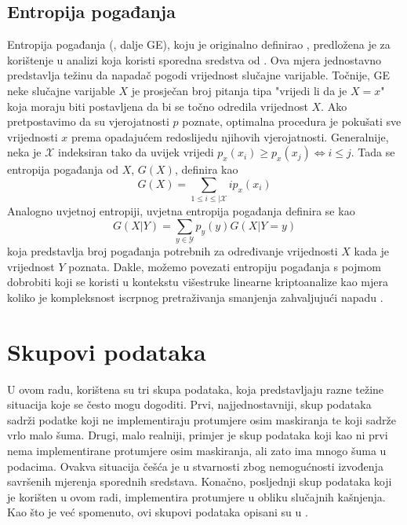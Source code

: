 \documentclass[times, utf8, diplomski]{fer}
\begin{document}
\subsection{Entropija pogađanja}

Entropija pogađanja (, dalje GE), koju je originalno definirao \cite{massey1994guessing}, predložena je za korištenje u analizi koja koristi sporedna sredstva od \cite{kopf2007information}. Ova mjera jednostavno predstavlja težinu da napadač pogodi vrijednost slučajne varijable. Točnije, GE neke slučajne varijable $X$ je prosječan broj pitanja tipa "vrijedi li da je $X = x$" koja moraju biti postavljena da bi se točno odredila vrijednost $X$. Ako pretpostavimo da su vjerojatnosti $p$ poznate, optimalna procedura je pokušati sve vrijednosti $x$ prema opadajućem redoslijedu njihovih vjerojatnosti. Generalnije, neka je $\mathcal{X}$ indeksiran tako da uvijek vrijedi $p_x(x_i) \ge p_x(x_j) \iff i \le j$. Tada se entropija pogađanja od $X$, $G(X)$, definira kao
\begin{equation}
    G(X) = \sum_{1 \le i \le \vert \mathcal{X}} i p_x(x_i)
\end{equation}
Analogno uvjetnoj entropiji, uvjetna entropija pogađanja definira se kao
\begin{equation}
    G(X \vert Y) = \sum_{y \in \mathcal{Y}} p_y(y) G(X \vert Y = y)
\end{equation}
koja predstavlja broj pogađanja potrebnih za određivanje vrijednosti $X$ kada je vrijednost $Y$ poznata. Dakle, možemo povezati entropiju pogađanja s pojmom dobrobiti koji se koristi u kontekstu višestruke linearne kriptoanalize kao mjera koliko je kompleksnost iscrpnog pretraživanja smanjenja zahvaljujući napadu \citep{standaert2009unified}.

\section{Skupovi podataka}
U ovom radu, korištena su tri skupa podataka, koja predstavljaju razne težine situacija koje se često mogu dogoditi. Prvi, najjednostavniji, skup podataka sadrži podatke koji ne implementiraju protumjere osim maskiranja te koji sadrže vrlo malo šuma. Drugi, malo realniji, primjer je skup podataka koji kao ni prvi nema implementirane protumjere osim maskiranja, ali zato ima mnogo šuma u podacima. Ovakva situacija češća je u stvarnosti zbog nemogućnosti izvođenja savršenih mjerenja sporednih sredstava. Konačno, posljednji skup podataka koji je korišten u ovom radi, implementira protumjere u obliku slučajnih kašnjenja. Kao što je već spomenuto, ovi skupovi podataka opisani su u \cite{8836108}.
\end{document}
